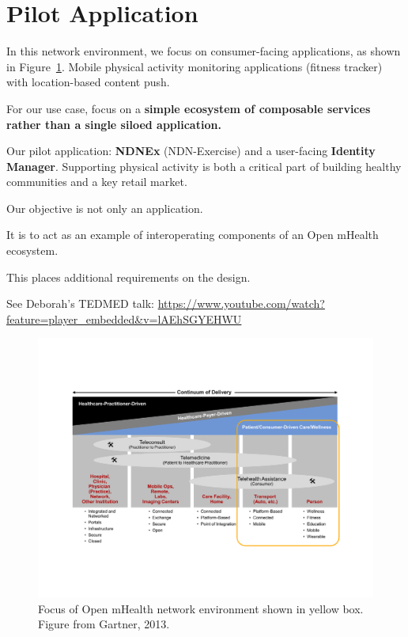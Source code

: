 \section{Pilot Application}

In this network environment, we focus on consumer-facing applications, as shown in Figure~\ref{fig:continuum}. 
Mobile physical activity monitoring applications
(fitness tracker) with location-based content push.

For our use case, focus on a \textbf{simple ecosystem of composable services rather than a single siloed application.}

Our pilot application:  \textbf{NDNEx} (NDN-Exercise) and a user-facing \textbf{Identity Manager}.  Supporting physical activity is both a critical part of building healthy communities and a key retail market. 

Our objective is not only an application.

It is to act as an example of interoperating components of an Open mHealth ecosystem.

This places additional requirements on the design.

See Deborah's TEDMED talk: 
\url{https://www.youtube.com/watch?feature=player_embedded&v=lAEhSGYEHWU}


\begin{figure}
\begin{center}
\includegraphics[width=.8\textwidth]{figures/continuum}
\caption{{Focus of Open mHealth network environment shown in yellow box. Figure from Gartner, 2013.  }}
\label{fig:continuum}
\end{center}
\end{figure}


